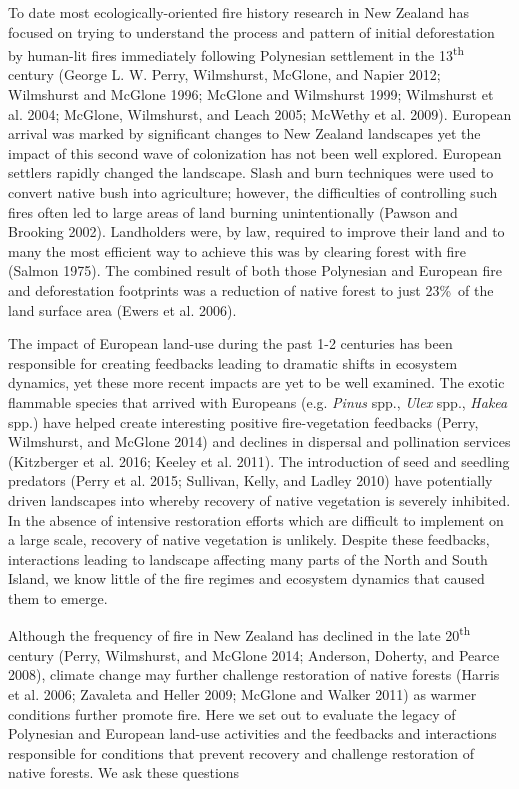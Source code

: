 To date most ecologically-oriented fire history research in New Zealand
has focused on trying to understand the process and pattern of initial
deforestation by human-lit fires immediately following Polynesian
settlement in the 13\textsuperscript{th} century (George L. W. Perry,
Wilmshurst, McGlone, and Napier 2012; Wilmshurst and McGlone 1996;
McGlone and Wilmshurst 1999; Wilmshurst et al. 2004; McGlone,
Wilmshurst, and Leach 2005; McWethy et al. 2009). European arrival was
marked by significant changes to New Zealand landscapes yet the impact
of this second wave of colonization has not been well explored. European
settlers rapidly changed the landscape. Slash and burn techniques were
used to convert native bush into agriculture; however, the difficulties
of controlling such fires often led to large areas of land burning
unintentionally (Pawson and Brooking 2002). Landholders were, by law,
required to improve their land and to many the most efficient way to
achieve this was by clearing forest with fire (Salmon 1975). The
combined result of both those Polynesian and European fire and
deforestation footprints was a reduction of native forest to just
23\%~of the land surface area (Ewers et al. 2006).

The impact of European land-use during the past 1-2 centuries has been
responsible for creating feedbacks leading to dramatic shifts in
ecosystem dynamics, yet these more recent impacts are yet to be well
examined. The exotic flammable species that arrived with Europeans (e.g.
\emph{Pinus} spp., \emph{Ulex} spp., \emph{Hakea} spp.) have helped
create interesting positive fire-vegetation feedbacks (Perry,
Wilmshurst, and McGlone 2014) and declines in dispersal and pollination
services (Kitzberger et al. 2016; Keeley et al. 2011). The introduction
of seed and seedling predators (Perry et al. 2015; Sullivan, Kelly, and
Ladley 2010) have potentially driven landscapes into whereby recovery of
native vegetation is severely inhibited. In the absence of intensive
restoration efforts which are difficult to implement on a large scale,
recovery of native vegetation is unlikely. Despite these feedbacks,
interactions leading to landscape affecting many parts of the North and
South Island, we know little of the fire regimes and ecosystem dynamics
that caused them to emerge.

Although the frequency of fire in New Zealand has declined in the late
20\textsuperscript{th} century (Perry, Wilmshurst, and McGlone 2014;
Anderson, Doherty, and Pearce 2008), climate change may further
challenge restoration of native forests (Harris et al. 2006; Zavaleta
and Heller 2009; McGlone and Walker 2011) as warmer conditions further
promote fire. Here we set out to evaluate the legacy of Polynesian and
European land-use activities and the feedbacks and interactions
responsible for conditions that prevent recovery and challenge
restoration of native forests. We ask these questions

